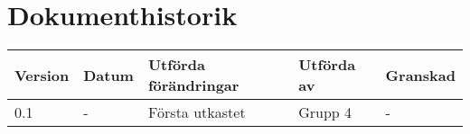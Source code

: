 \documentclass[11pt]{article}
\begin{document}
\tableofcontents

\pagebreak
\section*{Dokumenthistorik}
\begin{table}[h]
\begin{tabular}{|l|l|l|l|l|} \hline

\textbf{Version} & \textbf{Datum} & \textbf{Utförda förändringar} & \textbf{Utförda av} & \textbf{Granskad} \\ \hline
0.1 & - &  Första utkastet & Grupp 4 & - \\ \hline
\end{tabular}
\end{table}

\pagebreak
{}
\end{document}
